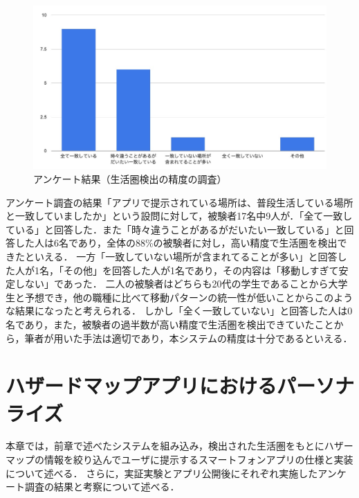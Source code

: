 \documentclass[a4paper]{jsarticle}
\begin{document}
\fifigure
\begin{figure}[H]
  \begin{center}
    \includegraphics[width=0.9\hsize]{./images/system_result.jpg}
    \caption{アンケート結果（生活圏検出の精度の調査）}
    \label{fig:system-result}
  \end{center}
\end{figure}
\fi

アンケート調査の結果「アプリで提示されている場所は、普段生活している場所と一致していましたか」という設問に対して，被験者17名中9人が．「全て一致している」と回答した．また「時々違うことがあるがだいたい一致している」と回答した人は6名であり，全体の88\%の被験者に対し，高い精度で生活圏を検出できたといえる．
一方「一致していない場所が含まれてることが多い」と回答した人が1名，「その他」を回答した人が1名であり，その内容は「移動しすぎて安定しない」であった．
二人の被験者はどちらも20代の学生であることから大学生と予想でき，他の職種に比べて移動パターンの統一性が低いことからこのような結果になったと考えられる．
しかし「全く一致していない」と回答した人は0名であり，また，被験者の過半数が高い精度で生活圏を検出できていたことから，筆者が用いた手法は適切であり，本システムの精度は十分であるといえる．




\section{ハザードマップアプリにおけるパーソナライズ}
本章では，前章で述べたシステムを組み込み，検出された生活圏をもとにハザーマップの情報を絞り込んでユーザに提示するスマートフォンアプリの仕様と実装について述べる．
さらに，実証実験とアプリ公開後にそれぞれ実施したアンケート調査の結果と考察について述べる．
\end{document}
